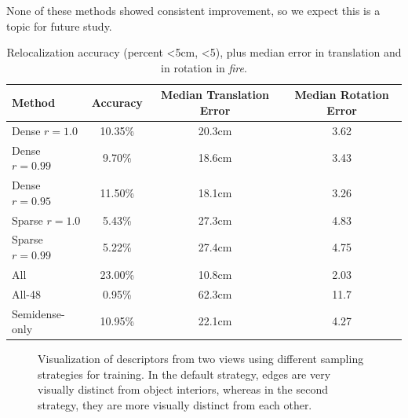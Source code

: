 None of these methods showed consistent improvement, so we expect this is a topic for future study.

\begin{table}[h]
	\begin{tabular} { l | c c c}
		Method & Accuracy & Median Translation Error & Median Rotation Error \\
		\hline
		Dense $r=1.0$  & 10.35\% & 20.3cm & 3.62\textdegree \\
		Dense $r=0.99$ & 9.70\% & 18.6cm  & 3.43\textdegree \\
		Dense $r=0.95$ & 11.50\% & 18.1cm & 3.26\textdegree \\
		\hline
		Sparse $r=1.0$   & 5.43\% & 27.3cm & 4.83\textdegree \\
		Sparse $r=0.99$  & 5.22\% & 27.4cm & 4.75\textdegree \\
		\hline
		All            & 23.00\% & 10.8cm & 2.03\textdegree \\
		All-48         & 0.95\% &  62.3cm & 11.7\textdegree \\
		Semidense-only & 10.95\% & 22.1cm & 4.27\textdegree \\
	\end{tabular}
	\caption{Relocalization accuracy (percent \textless5cm, \textless5\textdegree), plus median error in translation and in rotation in \textit{fire}.}
	\label{tab:7scenes-fire-alt}
\end{table}


\begin{figure}
	\centering
	
	\quad
	\caption{Visualization of descriptors from two views using different sampling strategies for training. In the default strategy, edges are very visually distinct from object interiors, whereas in the second strategy, they are more visually distinct from each other.}
	\label{fig:obs-vis}
\end{figure}

